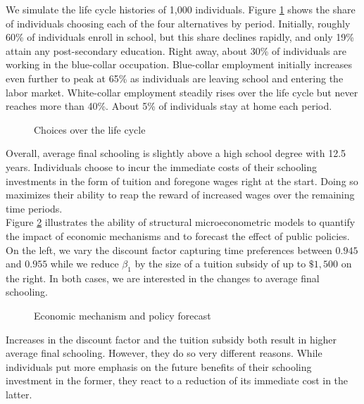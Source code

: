 \noindent We simulate the life cycle histories of 1,000 individuals. Figure \ref{Choices over the life cycle} shows the share of individuals choosing each of the four alternatives by period. Initially, roughly 60\% of individuals enroll in school, but this share declines rapidly, and only 19\% attain any post-secondary education. Right away, about 30\% of individuals are working in the blue-collar occupation.  Blue-collar employment initially increases even further to peak at 65\% as individuals are leaving school and entering the labor market. White-collar employment steadily rises over the life cycle but never reaches more than 40\%. About 5\% of individuals stay at home each period.

\begin{figure}[ht!]\centering
\caption{Choices over the life cycle}\label{Choices over the life cycle}
\end{figure}\FloatBarrier

\noindent Overall, average final schooling is slightly above a high school degree with 12.5 years. Individuals choose to incur the immediate costs of their schooling investments in the form of tuition and foregone wages right at the start. Doing so maximizes their ability to reap the reward of increased wages over the remaining time periods.\\

\noindent Figure \ref{Economic mechanism and policy forecast} illustrates the ability of structural microeconometric models to quantify the impact of economic mechanisms and to forecast the effect of public policies. On the left, we vary the discount factor capturing time preferences between $0.945$ and $0.955$ while we reduce $\beta_1$ by the size of a tuition subsidy of up to $\$1,500$ on the right. In both cases, we are interested in the changes to average final schooling.

\begin{figure}[h!]\centering
\caption{Economic mechanism and policy forecast}\label{Economic mechanism and policy forecast}
\hspace{0.3cm}
\end{figure}\FloatBarrier

\noindent Increases in the discount factor and the tuition subsidy both result in higher average final schooling. However, they do so very different reasons. While individuals put more emphasis on the future benefits of their schooling investment in the former, they react to a reduction of its immediate cost in the latter.
